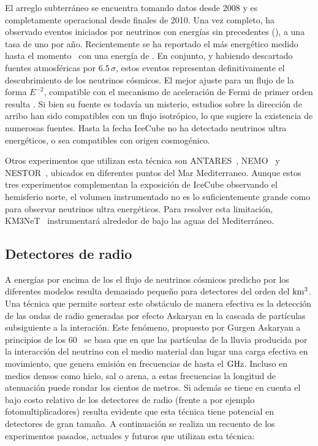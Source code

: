 	El arreglo subterráneo se encuentra tomando datos desde 2008 y es completamente operacional desde finales de 2010. 
	Una vez completo, ha observado eventos iniciados por neutrinos con energ\'ias sin precedentes (), a una tasa de uno por a\~no.
	Recientemente se ha reportado el m\'as energ\'etico medido hasta el momento~\cite{cite:iceCubeEvent} con una energ\'ia de .
	En conjunto, y habiendo descartado fuentes atmosf\'ericas por $6.5\,\sigma$, estos eventos representan definitivamente el descubrimiento de los neutrinos c\'osmicos.
	El mejor ajuste para un flujo de la forma $E^{-2}$, compatible con el mecanismo de aceleraci\'on de Fermi de primer orden resulta \cite{cite:multimess}.
	Si bien su fuente es todav\'ia un misterio, estudios sobre la direcci\'on de arribo han sido compatibles con un flujo isotr\'opico, lo que sugiere la existencia de numerosas fuentes.
	Hasta la fecha IceCube no ha detectado neutrinos ultra energ\'eticos, o sea compatibles con origen cosmog\'enico.
	
	Otros experimentos que utilizan esta t\'ecnica son ANTARES~\cite{cite:Antares1}, NEMO~\cite{cite:Nemo1} y NESTOR~\cite{cite:Nestor1}, ubicados en diferentes puntos del Mar Mediterraneo.
	Aunque estos tres experimentos complementan la exposici\'on de IceCube observando el hemisferio norte, el volumen instrumentado no es lo suficientemente grande como para observar neutrinos ultra energ\'eticos.
	Para resolver esta limitaci\'on, KM3NeT~\cite{cite:km3Net1} instrumentar\'a alrededor de  bajo las aguas del Mediterr\'aneo.
	
	\subsection{Detectores de radio}
	A energ\'ias por encima de los  el flujo de neutrinos c\'osmicos predicho por los diferentes modelos resulta demasiado peque\~no para  detectores del orden del $\rm km^3$. 
	Una t\'ecnica que permite sortear este obst\'aculo de manera efectiva es la detecci\'on de las ondas de radio generadas por efecto Askaryan en la cascada de part\'iculas subsiguiente a la interaci\'on. Este fenómeno, propuesto por Gurgen Askaryan a principios de los 60~\cite{cite:Askaryan} se basa que en que las part\'iculas de la lluvia producida por la interacci\'on del neutrino con el medio material dan lugar una carga efectiva en movimiento, que genera emisi\'on \cher{} en frecuencias de hasta el $\rm GHz$.
	Incluso en medios densos como hielo, sal o arena, a estas frecuencias la longitud de atenuaci\'on puede rondar los cientos de metros.
	Si adem\'as se tiene en cuenta el bajo costo relativo de los detectores de radio (frente a por ejemplo fotomultiplicadores) resulta evidente que esta t\'ecnica tiene potencial en detectores de gran tama\~no.
	A continuaci\'on se realiza un recuento de los experimentos pasados, actuales y futuros que utilizan esta t\'ecnica:
	

